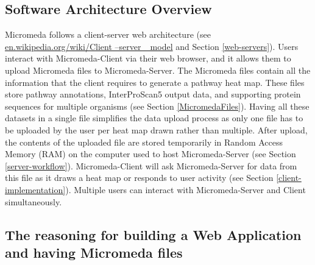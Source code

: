 \subsection{Software Architecture Overview}

Micromeda follows a client-server web architecture \cite{svobodova1985client} (see \href{en.wikipedia.org/wiki/Client–server\_model}{en.wikipedia.org/wiki/Client –server \_model} and Section \ref{web-servers}). Users interact with Micromeda-Client via their web browser, and it allows them to upload Micromeda files to Micromeda-Server. The Micromeda files contain all the information that the client requires to generate a pathway heat map. These files store pathway annotations, InterProScan5 output data, and supporting protein sequences for multiple organisms (see Section \ref{MicromedaFiles}). Having all these datasets in a single file simplifies the data upload process as only one file has to be uploaded by the user per heat map drawn rather than multiple. After upload, the contents of the uploaded file are stored temporarily in Random Access Memory (RAM) on the computer used to host Micromeda-Server (see Section \ref{server-workflow}). Micromeda-Client will ask Micromeda-Server for data from this file as it draws a heat map or responds to user activity (see Section \ref{client-implementation}). Multiple users can interact with Micromeda-Server and Client simultaneously.

\subsection{The reasoning for building a Web Application and having Micromeda files} \label{why-micromeda-files}

